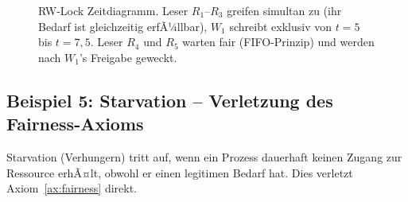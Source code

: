 ﻿\documentclass[a4paper,12pt]{article}
\theoremstyle{definition}
\begin{document}
\begin{figure}[H]
\begin{tikzpicture}
\end{tikzpicture}
\caption{RW-Lock Zeitdiagramm. Leser $R_1$--$R_3$ greifen simultan zu
  (ihr Bedarf ist gleichzeitig erfÃ¼llbar), $W_1$ schreibt exklusiv
  von $t=5$ bis $t=7{,}5$. Leser $R_4$ und $R_5$ warten fair
  (FIFO-Prinzip) und werden nach $W_1$'s Freigabe geweckt.}
\label{fig:tikz4}
\end{figure}

\subsection{Beispiel 5: Starvation -- Verletzung des Fairness-Axioms}

Starvation (Verhungern) tritt auf, wenn ein Prozess dauerhaft
keinen Zugang zur Ressource erhÃ¤lt, obwohl er einen legitimen Bedarf hat.
Dies verletzt Axiom~\ref{ax:fairness} direkt.
\end{document}
